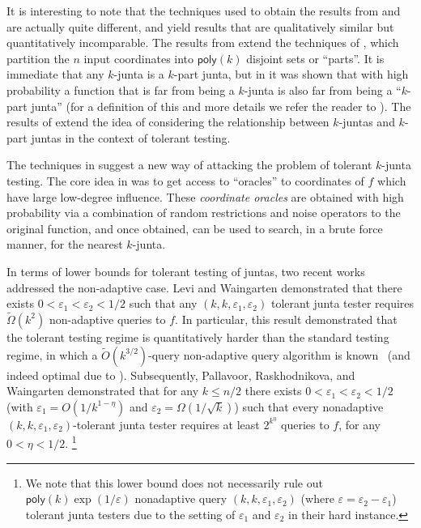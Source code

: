 \documentclass[10pt,a4paper]{article}
\providecommand{\poly}{\mathsf{poly}}
\newcommand{\say}[1]{``#1''}
\theoremstyle{plain}
\theoremstyle{remark}
\theoremstyle{plain}
\newcommand{\eps}{\varepsilon}
\renewcommand{\tilde}{\widetilde}
\begin{document}
It is interesting to note that the techniques used to obtain the results from \cite{junta-submodular-opt} and \cite{junta-coordinate-oracles} are actually quite different, and yield results that are qualitatively similar but quantitatively incomparable. The results from \cite{junta-submodular-opt} extend the techniques of \cite{og-junta-testing}, which partition the $n$ input coordinates into $\poly(k)$ disjoint sets or \say{parts}. It is immediate that any $k$-junta is a $k$-part junta, but in \cite{og-junta-testing} it was shown that with high probability a function that is far from being a $k$-junta is also far from being a \say{$k$-part junta} (for a definition of this and more details we refer the reader to \cite{og-junta-testing}). 
The results of \cite{junta-submodular-opt} extend the idea of considering the relationship between $k$-juntas and $k$-part juntas in the context of tolerant testing. 

The techniques in \cite{junta-coordinate-oracles} suggest a new way of attacking the problem of tolerant $k$-junta testing. The core idea in \cite{junta-coordinate-oracles} was to get access to \say{oracles} to coordinates of $f$ which have large low-degree influence. These \emph{coordinate oracles} are obtained with high probability via a combination of random restrictions and noise operators to the original function, and once obtained, can be used to search, in a brute force manner, for the nearest $k$-junta. 

In terms of lower bounds for tolerant testing of juntas, two recent works addressed the non-adaptive case. Levi and Waingarten \cite{first-nonadaptive-junta-lbs} demonstrated that there exists $0<\eps_1<\eps_2<1/2$ such that any $(k, k, \eps_1,\eps_2)$ tolerant junta tester requires $\tilde{\Omega}(k^2)$ non-adaptive queries to $f$. In particular, this result demonstrated that the tolerant testing regime is quantitatively harder than the standard testing regime, in which a $\tilde{O}(k^{3/2})$-query non-adaptive query algorithm is known~\cite{ogg-testing-juntas} (and indeed optimal due to \cite{DBLP:journals/jacm/ChenSTWX18}). Subsequently, Pallavoor, Raskhodnikova, and Waingarten \cite{junta-lbs-PRW20} demonstrated that for any $k \le n/2$ there exists $0<\eps_1<\eps_2<1/2$ (with $\eps_1 = O(1/k^{1-\eta})$ and $\eps_2 = \Omega(1/\sqrt{k})$) such that every nonadaptive $(k, k, \eps_1,\eps_2)$-tolerant junta tester  requires at least $2^{k^\eta}$ queries to $f$, for any $0<\eta<1/2$.
\footnote{
We note that this lower bound does not necessarily rule out $\poly(k)\exp(1/\eps)$ nonadaptive query $(k, k, \eps_1, \eps_2)$ (where $\eps = \eps_2-\eps_1$) tolerant junta testers due to the setting of $\eps_1$ and $\eps_2$ in their hard instance.}
\end{document}
